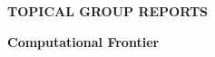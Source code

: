 

  \vfill

\begin{center}
\begin{Huge}   {\bf  TOPICAL GROUP REPORTS}

\bigskip

\bigskip

 {\bf Computational  Frontier }

\vfill

\vfill

\end{Huge}
\end{center}

\newpage
\thispagestyle{empty}
\mbox{\null}



